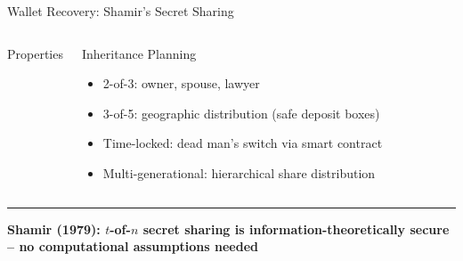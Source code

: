 \documentclass[8pt,aspectratio=169]{beamer}
\newcommand{\bottomnote}[1]{\vfill\vspace{-2mm}\textcolor{mllavender2}{\rule{\textwidth}{0.4pt}}\vspace{1mm}\footnotesize\textbf{#1}}
\begin{document}
\begin{frame}{Wallet Recovery: Shamir's Secret Sharing}
\begin{columns}
\begin{block}{Properties}
\begin{itemize}
\end{itemize}
\end{block}
\begin{block}{Inheritance Planning}
\begin{itemize}\small
  \item 2-of-3: owner, spouse, lawyer
  \item 3-of-5: geographic distribution (safe deposit boxes)
  \item Time-locked: dead man's switch via smart contract
  \item Multi-generational: hierarchical share distribution
\end{itemize}
\end{block}
\end{columns}
\bottomnote{Shamir (1979): $t$-of-$n$ secret sharing is information-theoretically secure -- no computational assumptions needed}
\end{frame}
\end{document}
